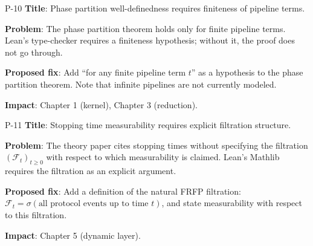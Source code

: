\begin{proposal}{P-10}
\textbf{Title}: Phase partition well-definedness requires finiteness of pipeline terms.

\noindent\textbf{Problem}: The phase partition theorem holds only for finite
pipeline terms. Lean's type-checker requires a finiteness hypothesis; without it,
the proof does not go through.

\noindent\textbf{Proposed fix}: Add ``for any finite pipeline term $t$'' as a
hypothesis to the phase partition theorem. Note that infinite pipelines are not
currently modeled.

\noindent\textbf{Impact}: Chapter 1 (kernel), Chapter 3 (reduction).
\end{proposal}

\begin{proposal}{P-11}
\textbf{Title}: Stopping time measurability requires explicit filtration structure.

\noindent\textbf{Problem}: The theory paper cites stopping times without specifying
the filtration $(\mathcal{F}_t)_{t \geq 0}$ with respect to which measurability
is claimed. Lean's Mathlib requires the filtration as an explicit argument.

\noindent\textbf{Proposed fix}: Add a definition of the natural FRFP filtration:
$\mathcal{F}_t = \sigma(\text{all protocol events up to time } t)$, and state
measurability with respect to this filtration.

\noindent\textbf{Impact}: Chapter 5 (dynamic layer).
\end{proposal}
